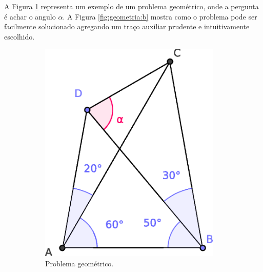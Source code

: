 \begin{itemize}
\begin{example}
A Figura \ref{fig:geometria:a} representa um exemplo de um problema geométrico, 
onde a pergunta é achar o angulo $\alpha$. 
A Figura \ref{fig:geometria:b} mostra
como o problema pode ser facilmente solucionado agregando um traço auxiliar 
prudente e intuitivamente escolhido.
\end{example}
\begin{figure}[!h]
  \centering
     \begin{subfigure}[b]{0.45\textwidth}
         \centering
         \includegraphics[width=0.95\textwidth]{chapters/cap-learning/prob-geometria1.eps} 
         \caption{Problema geométrico.}
         \label{fig:geometria:a}
     \end{subfigure}
     \hfill
     \begin{subfigure}[b]{0.45\textwidth}
         \centering

\end{subfigure}
\end{figure}
\end{itemize}
